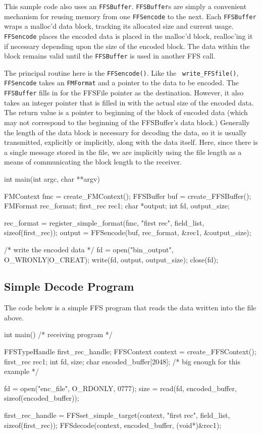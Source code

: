This sample code also uses an {\tt FFSBuffer}.  {\tt FFSBuffer}s are simply
a convenient mechanism for reusing memory from one {\tt FFSencode} to the
next.  Each {\tt FFSBuffer} wraps a malloc'd data block, tracking its
allocated size and current usage.  {\tt FFSencode} places the encoded data
is placed in the malloc'd block, realloc'ing it if necessary depending 
upon the size of the encoded block.  The data within the block remains
valid until the {\tt FFSBuffer} is used in another FFS call.

The principal routine here is the {\tt FFSencode()}.  Like the {\tt
write\_FFSfile()}, {\tt FFSencode} takes an {\tt FMFormat} and a pointer
to the data to be encoded.  The {\tt FFSBuffer} fills in for the FFSFile
pointer as the destination.  However, it also takes an integer pointer that
is filled in with the actual size of the encoded data.  The return value is
a pointer to beginning of the block of encoded data (which may not
correspond to the beginning of the FFSBuffer's data block.)  Generally the
length of the data block is necessary for decoding the data, so it is
usually transmitted, explicitly or implicitly, along with the data itself.
Here, since there is a single message stored in the file, we are implicitly
using the file length as a means of communicating the block length to the
receiver.

\begin{Code}
int main(int argc, char **argv)
{
    FMContext fmc = create_FMContext();
    FFSBuffer buf = create_FFSBuffer();
    FMFormat rec_format;
    first_rec rec1;
    char *output;
    int fd, output_size;

    rec_format = register_simple_format(fmc, "first rec", field_list, sizeof(first_rec));
    output = FFSencode(buf, rec_format, &rec1, &output_size);

    /* write the encoded data */
    fd = open("bin_output", O_WRONLY|O_CREAT);
    write(fd, output, output_size);
    close(fd);
}
\end{Code}

\subsection{Simple Decode Program\label{decode}}

The code below is a simple FFS program that reads the data written into the
file above.  
\begin{Code}
int main()     /* receiving program */
{
    FFSTypeHandle first_rec_handle;
    FFSContext context = create_FFSContext();
    first_rec rec1;
    int fd, size;
    char encoded_buffer[2048];  /* big enough for this example */

    fd = open("enc_file", O_RDONLY, 0777);
    size = read(fd, encoded_buffer, sizeof(encoded_buffer));

    first_rec_handle = FFSset_simple_target(context, "first rec", field_list, sizeof(first_rec));
    FFSdecode(context, encoded_buffer, (void*)&rec1);
}
\end{Code}

